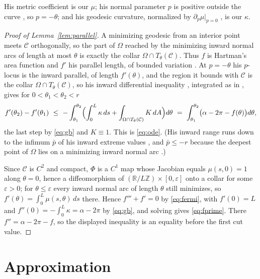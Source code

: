 \documentclass[11pt,oneside,reqno]{amsart}
\theoremstyle{plain}
\theoremstyle{definition}
\newcommand{\R}{\mathbb{R}}
\begin{document}
His metric coefficient is our $\mu$; his normal parameter $p$ is positive
outside the curve \cite[\S2]{Hartman64}, so $p=-\theta$; and his geodesic
curvature, normalized by $\partial_{p}\mu|_{p=0}$ \cite[(2.4)]{Hartman64}, is
our $\kappa$.

\begin{proof}[Proof of Lemma~\ref{lem:parallel}]
A minimizing geodesic from an interior point meets $\mathcal{C}$ orthogonally, so
the part of $\Omega$ reached by the minimizing inward normal arcs of length at
most $\theta$ is exactly the collar $\Omega\cap T_{\theta}(\mathcal{C})$. Thus $f$ is
Hartman's area function and $f'$ his parallel length, of bounded variation
\cite[Prop.~5.1, (6.8), (6.29), (6.30), Thm.~6.2, Cor.~6.2]{Hartman64}. At
$p=-\theta$ his $p$-locus is the inward parallel, of length $f'(\theta)$, and
the region it bounds with $\mathcal{C}$ is the collar
$\Omega\cap T_{\theta}(\mathcal{C})$, so his inward differential inequality
\cite[(6.4)]{Hartman64}, integrated as in \cite[Cor.~6.1]{Hartman64}, gives for
$0<\theta_{1}<\theta_{2}<r$
\[
  f'(\theta_{2})-f'(\theta_{1})\ \le\
  -\int_{\theta_{1}}^{\theta_{2}}
    \Bigl(\int_{0}^{L}\kappa\,ds
      +\int_{\Omega\cap T_{\theta}(\mathcal{C})}K\,dA\Bigr)d\theta
  \ =\ \int_{\theta_{1}}^{\theta_{2}}\bigl(\alpha-2\pi-f(\theta)\bigr)d\theta ,
\]
the last step by \eqref{eq:gb} and $K\equiv1$. This is \eqref{eq:ode}. (His
inward range runs down to the infimum $\bar{p}$ of his inward extreme values
\cite[\S6]{Hartman64}, and $\bar{p}\le-r$ because the deepest point of $\Omega$
lies on a minimizing inward normal arc \cite[Prop.~5.1]{Hartman64}.)

Since $\mathcal{C}$ is $C^{2}$ and compact, $\Phi$ is a $C^{1}$ map whose
Jacobian equals $\mu(s,0)=1$ along $\theta=0$, hence a diffeomorphism of
$(\R/L\mathbb{Z})\times[0,\varepsilon]$ onto a collar for some $\varepsilon>0$;
for $\theta\le\varepsilon$ every inward normal arc of length $\theta$ still
minimizes, so $f'(\theta)=\int_{0}^{L}\mu(s,\theta)\,ds$ there. Hence $f'''+f'=0$
by \eqref{eq:fermi}, with $f'(0)=L$ and
$f''(0)=-\int_{0}^{L}\kappa=\alpha-2\pi$ by \eqref{eq:gb}, and solving gives
\eqref{eq:fprime}. There $f''=\alpha-2\pi-f$, so the displayed inequality is an
equality before the first cut value.
\end{proof}

\section{Approximation}\label{app:approx}
\end{document}
